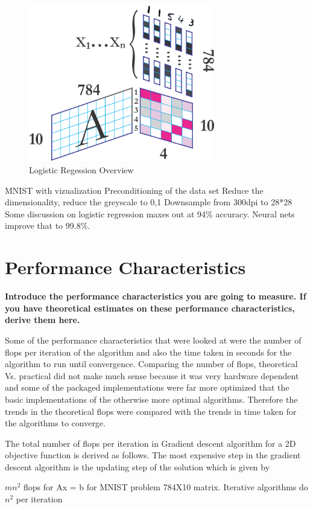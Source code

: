 \documentclass[10pt,twocolumn]{article}
\begin{document}
\begin{figure}
\includegraphics[width=3.2in]{./mnist-logistic.png}
\caption{Logistic Regession Overview}
\end{figure}


MNIST with vizualization
Preconditioning of the data set
Reduce the dimensionality, reduce the greyscale to 0,1
Downsample from 300dpi to 28*28
Some discussion on logistic regression maxes out at 94\% accuracy. Neural nets improve that to 99.8\%. 


\section{Performance Characteristics}

\textbf{Introduce the performance characteristics you are going to measure. If you have theoretical estimates on these performance characteristics, derive them here.}

Some of the performance characteristics that were looked at were the number of flops per iteration of the algorithm and also the time taken in seconds for the algorithm to run until convergence. Comparing the number of flops, theoretical Vs. practical did not make much sense because it was very hardware dependent and some of the packaged implementations were far more optimized that the basic implementations of the otherwise more optimal algorithms. Therefore the trends in the theoretical flops were compared with the trends in time taken for the algorithms to converge. 

The total number of flops per iteration in Gradient descent algorithm for a 2D objective function is derived as follows. The most expensive step in the gradient descent algorithm is the updating step of the solution which is given by 


$mn^2$ flops for Ax = b for MNIST problem 784X10 matrix. 
Iterative algorithms do $n^2$ per iteration
\end{document}
